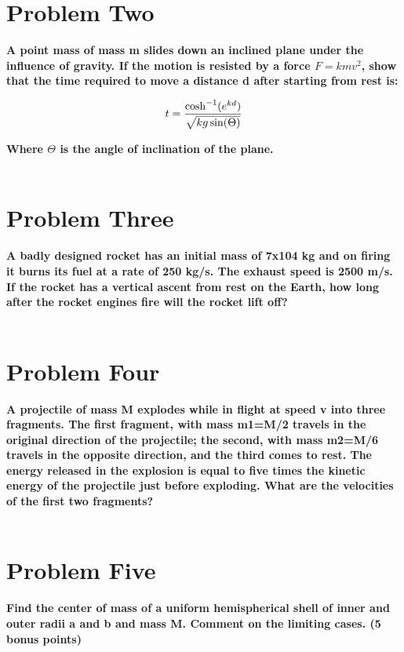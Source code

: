 \documentclass[10pt]{article} %
\begin{document}
\vspace{1 cm}

\section{Problem Two}
\textbf{A point mass of mass m slides down an inclined plane under the influence of gravity. If the motion is resisted by a force $F=kmv^2$, show that the time required to move a distance d after starting from rest is:}

\begin{equation*}
  t = \frac{\cosh^{-1}(e^{kd})}{\sqrt{kg\sin(\Theta)}}\\
\end{equation*}

\textbf{Where $\Theta$ is the angle of inclination of the plane.} \\ \\





\vspace{1 cm}

\section{Problem Three}
\textbf{A badly designed rocket has an initial mass of 7x104 kg and on firing it burns its fuel at a rate of 250 kg/s. The exhaust speed is 2500 m/s. If the rocket has a vertical ascent from rest on the Earth, how long after the rocket engines fire will the rocket lift off?} \\ \\
\vspace{1 cm}

\section{Problem Four}
\textbf{A projectile of mass M explodes while in flight at speed v into three fragments. The first fragment, with mass m1=M/2 travels in the original direction of the projectile; the second, with mass m2=M/6 travels in the opposite direction, and the third comes to rest. The energy released in the explosion is equal to five times the kinetic energy of the projectile just before exploding. What are the velocities of the first two fragments?} \\ \\
\vspace{1 cm}

\section{Problem Five}
\textbf{Find the center of mass of a uniform hemispherical shell of inner and outer radii a and b and mass M. Comment on the limiting cases. (5 bonus points)} \\ \\
\vspace{1 cm}
\end{document}
